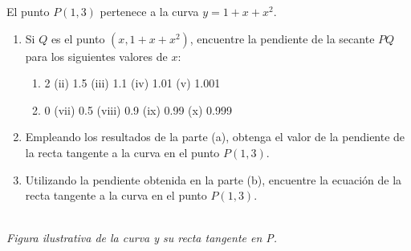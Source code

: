 \item El punto $P(1,3)$ pertenece a la curva $y = 1 + x + x^2$.
\begin{enumerate}
    \item[(a)] Si $Q$ es el punto $(x, 1 + x + x^2)$, encuentre la pendiente de la secante $PQ$ para los siguientes valores de $x$:
    \begin{enumerate}
        \item[(i)] 2 \quad (ii) 1.5 \quad (iii) 1.1 \quad (iv) 1.01 \quad (v) 1.001 
        \item[(vi)] 0 \quad (vii) 0.5 \quad (viii) 0.9 \quad (ix) 0.99 \quad (x) 0.999
    \end{enumerate}
    \item[(b)] Empleando los resultados de la parte (a), obtenga el valor de la pendiente de la recta tangente a la curva en el punto $P(1,3)$.
    \item[(c)] Utilizando la pendiente obtenida en la parte (b), encuentre la ecuación de la recta tangente a la curva en el punto $P(1,3)$.
\end{enumerate}

\vspace{0.5cm}
\begin{center}
\\
\textit{Figura ilustrativa de la curva y su recta tangente en P.}
\end{center}
